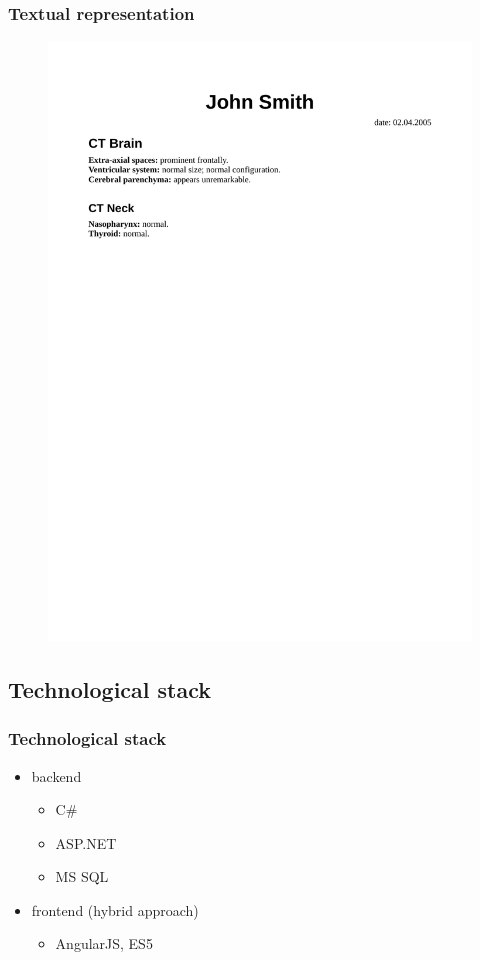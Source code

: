 \documentclass{beamer}
\begin{document}
\begin{frame}
\frametitle{Textual representation}
\begin{figure}
\centering
\includegraphics[width=\linewidth]{../rendered-report}
\label{fig:rendered-report}
\end{figure}
\end{frame}

\subsection{Technological stack}
\begin{frame}
\frametitle{Technological stack}
\begin{itemize}
	\item backend 
	\begin{itemize}
		\item C\#
		\item ASP.NET
		\item MS SQL 
	\end{itemize}
	\item frontend (hybrid approach)
	\begin{itemize}
		\item AngularJS, ES5 
	\end{itemize}
\end{itemize}

\end{frame}
\end{document}
